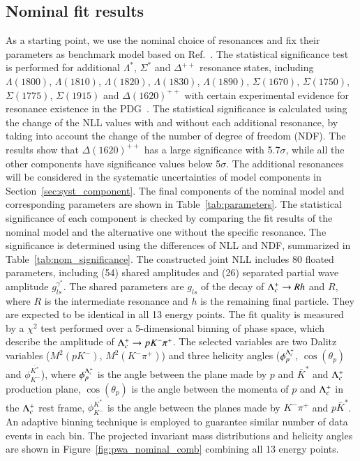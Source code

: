 \subsection{Nominal fit results}
\label{sec:nominal_fit}
As a starting point, we use the nominal choice of resonances and fix their parameters as benchmark model based on Ref.~\cite{LHCb:2022ouv}. The statistical significance test is performed for additional $\Lambda^*$, $\Sigma^*$ and $\Delta^{++}$ resonance states, including $\Lambda(1800)$, $\Lambda(1810)$, $\Lambda(1820)$, $\Lambda(1830)$, $\Lambda(1890)$, $\Sigma(1670)$, $\Sigma(1750)$, $\Sigma(1775)$, $\Sigma(1915)$ and $\Delta(1620)^{++}$ with certain experimental evidence for resonance existence in the PDG~\cite{Workman:2022ynf}.
The statistical significance is calculated using the change of the NLL values with and without each additional resonance, by taking into account the change of the number of degree of freedom (NDF). The results show that $\Delta(1620)^{++}$ has a large significance with 5.7$\sigma$, while all the other components have significance values below 5$\sigma$. The additional resonances will be considered in the systematic uncertainties of model components in Section~\ref{sec:syst_component}. 
The final components of the nominal model and corresponding parameters are shown in Table~\ref{tab:parameters}. The statistical significance of each component is checked by comparing the fit results of the nominal model and the alternative one without the specific resonance. The significance is determined using the differences of NLL and NDF, summarized in Table~\ref{tab:nom_significance}. The constructed joint NLL includes 80 floated parameters, including (54) shared amplitudes and (26) separated partial wave amplitude $g_{ls}^{\gamma^*}$. The shared parameters are $g_{ls}$ of the decay of $\Lambda_{c}^{+} \rightarrow Rh$ and $R$, where $R$ is the intermediate resonance and $h$ is the remaining final particle. They are expected to be identical in all 13 energy points. The fit quality is measured by a $\chi^2$ test performed over a 5-dimensional binning of phase space, which describe the amplitude of $\Lambda_{c}^{+}\rightarrow p K^-\pi^+$. The selected variables are two Dalitz variables ($M^2(pK^-)$, $M^2(K^-\pi^+)$) and three helicity angles ($\phi_{p}^{\Lambda_{c}^{+}}$, $\cos(\theta_{p})$ and $\phi_{K^{-}}^{\bar{K^{*}}}$), where $\phi_{p}^{\Lambda_{c}^{+}}$ is the angle between the plane made by $p$ and $\bar{K}^*$ and $\Lambda_{c}^{+}$ production plane, $\cos(\theta_{p})$ is the angle between the momenta of $p$ and $\Lambda_{c}^{+}$ in the $\Lambda_{c}^{+}$ rest frame, $\phi_{K^{-}}^{\bar{K^{*}}}$ is the angle between the planes made by $K^-\pi^+$ and $p \bar{K}^*$. An adaptive binning technique is employed to guarantee similar number of data events in each bin. The projected invariant mass distributions and helicity angles are shown in Figure~\ref{fig:pwa_nominal_comb} combining all 13 energy points.

